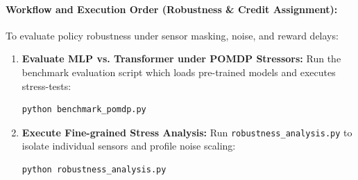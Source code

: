 \documentclass[11pt,a4paper]{article}
\begin{document}
\begin{table}[!ht]
    \centering
    \caption{Stressor Ablation Rewards (Mean over 5 Evaluation Runs)}
    \label{tab:pomdp_ablation}
\end{table}

\paragraph{Workflow and Execution Order (Robustness \& Credit Assignment):}
To evaluate policy robustness under sensor masking, noise, and reward delays:
\begin{enumerate}
    \item \textbf{Evaluate MLP vs. Transformer under POMDP Stressors:} Run the benchmark evaluation script which loads pre-trained models and executes stress-tests:
    \begin{lstlisting}[language=bash]
    python benchmark_pomdp.py
    \end{lstlisting}
    \item \textbf{Execute Fine-grained Stress Analysis:} Run \texttt{robustness\_analysis.py} to isolate individual sensors and profile noise scaling:
    \begin{lstlisting}[language=bash]
    python robustness_analysis.py
    \end{lstlisting}
\end{enumerate}

\FloatBarrier
\end{document}
